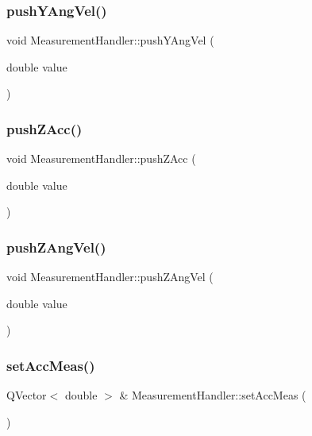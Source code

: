 \subsubsection{\texorpdfstring{push\+Y\+Ang\+Vel()}{pushYAngVel()}}
{\footnotesize\ttfamily void Measurement\+Handler\+::push\+Y\+Ang\+Vel (\begin{DoxyParamCaption}\item[{double}]{value }\end{DoxyParamCaption})}

\mbox{\label{class_measurement_handler_a6fea470ec1ca66864bf7f416dc878639}} 
\subsubsection{\texorpdfstring{push\+Z\+Acc()}{pushZAcc()}}
{\footnotesize\ttfamily void Measurement\+Handler\+::push\+Z\+Acc (\begin{DoxyParamCaption}\item[{double}]{value }\end{DoxyParamCaption})}

\mbox{\label{class_measurement_handler_a5155e86de3d5e138a3f510cbe9cc3932}} 
\subsubsection{\texorpdfstring{push\+Z\+Ang\+Vel()}{pushZAngVel()}}
{\footnotesize\ttfamily void Measurement\+Handler\+::push\+Z\+Ang\+Vel (\begin{DoxyParamCaption}\item[{double}]{value }\end{DoxyParamCaption})}

\mbox{\label{class_measurement_handler_ab31bf9f532b402898b3df7f27301f4c1}} 
\subsubsection{\texorpdfstring{set\+Acc\+Meas()}{setAccMeas()}}
{\footnotesize\ttfamily Q\+Vector$<$ double $>$ \& Measurement\+Handler\+::set\+Acc\+Meas (\begin{DoxyParamCaption}{ }\end{DoxyParamCaption})}


